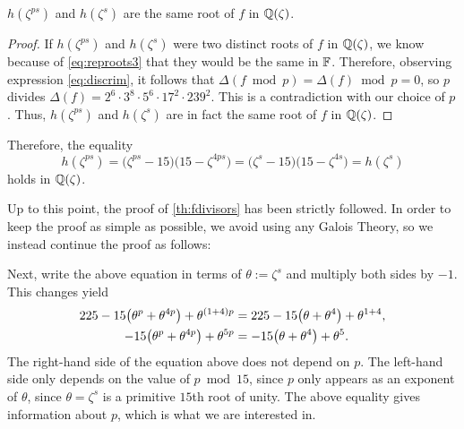 \documentclass[../main.tex]{subfiles}
\begin{document}
 	\begin{mdframed}\small
 	\begin{lemmanonumber}
 		$h(\zeta^{ps})$ and $h(\zeta^{s})$ are the same root of $f$ in $\mathbb{Q}(\zeta)$.
 	\end{lemmanonumber}
 	\begin{proof}
 		If $h(\zeta^{ps})$ and $h(\zeta^{s})$ were two distinct roots of $f$ in $\mathbb{Q}(\zeta)$, we know because of \cref{eq:reproots3} that they would be the same in $\mathbb{F}$. Therefore, observing expression \cref{eq:discrim}, it follows that $\Delta(f \bmod{p})=\Delta(f) \bmod{p}=0$, so $p$ divides $\Delta(f)=2^{6} \cdot 3^{8} \cdot 5^{6} \cdot 17^{2} \cdot 239^{2}$. This is a contradiction with our choice of $p$. Thus, $h(\zeta^{ps})$ and $h(\zeta^{s})$ are in fact the same root of $f$ in $\mathbb{Q}(\zeta)$.
 	\end{proof}
 	
 	Therefore, the equality
 	\begin{equation*}
 		h(\zeta^{ps})=\big(\zeta^{ps}-15\big)\big({15}-\zeta^{4ps}\big)=\big(\zeta^{s}-15\big)\big({15}-\zeta^{4s}\big)=h(\zeta^{s})
 	\end{equation*}
 	holds in $\mathbb{Q}(\zeta)$.
 	 \end{mdframed}
 	 
 	 Up to this point, the proof of \cref{th:fdivisors} has been strictly followed. In order to keep the proof as simple as possible, we avoid using any Galois Theory, so we instead continue the proof as follows:\\
 	 
 	 \begin{mdframed}\small
 	 Next, write the above equation in terms of $\theta:=\zeta^{s}$ and multiply both sides by $-1$. This changes yield
 	\begin{align}
 		225-{15}\big(\theta^{p}+\theta^{4p}\big)+\theta^{(1+4)p}&=225-{15}\big(\theta+\theta^{4}\big)+\theta^{1+4}, \notag \\
 		-15\big(\theta^{p}+\theta^{4p}\big)+\theta^{5p}&=-15\big(\theta+\theta^{4}\big)+\theta^{5}\label{eq:equality_in_theta}.
 	\end{align}
 	The right-hand side of the equation above does not depend on $p$. The left-hand side only depends on the value of $p\bmod{15}$, since $p$ only appears as an exponent of $\theta$, since $\theta=\zeta^{s}$ is a primitive $15$th root of unity. The above equality gives information about $p$, which is what we are interested in. 
 \end{mdframed}
 
\end{document}

